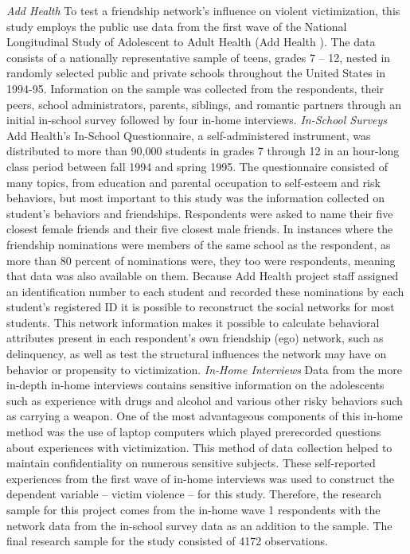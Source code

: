 \documentclass[]{article}
\begin{document}
\emph{Add Health} To test a friendship network's influence on violent
victimization, this study employs the public use data from the first
wave of the National Longitudinal Study of Adolescent to Adult Health
(Add Health ). The data consists of a nationally representative sample
of teens, grades 7 -- 12, nested in randomly selected public and private
schools throughout the United States in 1994-95. Information on the
sample was collected from the respondents, their peers, school
administrators, parents, siblings, and romantic partners through an
initial in-school survey followed by four in-home interviews.
\emph{In-School Surveys} Add Health's In-School Questionnaire, a
self-administered instrument, was distributed to more than 90,000
students in grades 7 through 12 in an hour-long class period between
fall 1994 and spring 1995. The questionnaire consisted of many topics,
from education and parental occupation to self-esteem and risk
behaviors, but most important to this study was the information
collected on student's behaviors and friendships. Respondents were asked
to name their five closest female friends and their five closest male
friends. In instances where the friendship nominations were members of
the same school as the respondent, as more than 80 percent of
nominations were, they too were respondents, meaning that data was also
available on them. Because Add Health project staff assigned an
identification number to each student and recorded these nominations by
each student's registered ID it is possible to reconstruct the social
networks for most students. This network information makes it possible
to calculate behavioral attributes present in each respondent's own
friendship (ego) network, such as delinquency, as well as test the
structural influences the network may have on behavior or propensity to
victimization. \emph{In-Home Interviews} Data from the more in-depth
in-home interviews contains sensitive information on the adolescents
such as experience with drugs and alcohol and various other risky
behaviors such as carrying a weapon. One of the most advantageous
components of this in-home method was the use of laptop computers which
played prerecorded questions about experiences with victimization. This
method of data collection helped to maintain confidentiality on numerous
sensitive subjects. These self-reported experiences from the first wave
of in-home interviews was used to construct the dependent variable --
victim violence -- for this study. Therefore, the research sample for
this project comes from the in-home wave 1 respondents with the network
data from the in-school survey data as an addition to the sample. The
final research sample for the study consisted of 4172 observations.
\end{document}
